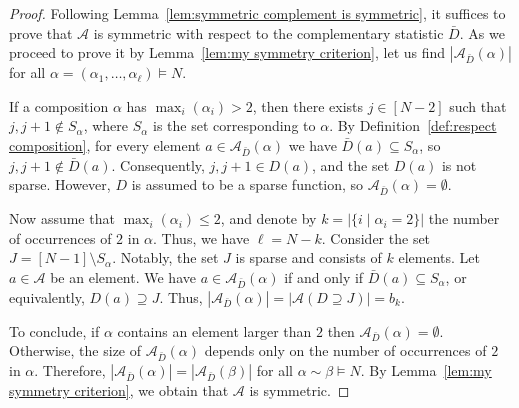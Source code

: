 \documentclass[11pt]{article}
\theoremstyle{definition}
\numberwithin{equation}{section}
\newcommand{\A}{\mathcal{A}}
\begin{document}
\begin{proof}
    Following Lemma~\ref{lem:symmetric complement is symmetric}, it suffices to prove that $\A$ is symmetric with respect to the complementary statistic $\bar{D}$. As we proceed to prove it by Lemma~\ref{lem:my symmetry criterion}, let us find $|\A_{\bar{D}}(\alpha)|$ for all $\alpha = (\alpha_1, \dots, \alpha_\ell) \vDash N$.
    
    If a composition $\alpha$ has $\max_i (\alpha_i) > 2$, 
    then there exists $j \in [N-2]$ such that $j,j+1 \notin S_\alpha$, where $S_\alpha$ is the set corresponding to $\alpha$. By Definition~\ref{def:respect composition}, for every element $a \in \A_{\bar{D}}(\alpha)$ we have $\bar{D}(a) \subseteq S_\alpha$, so $j, j + 1 \notin \bar{D}(a)$. Consequently, $j,j+1 \in D(a)$, and the set $D(a)$ is not sparse. However,
    $D$ is assumed to be a sparse function, so $\A_{\bar{D}}(\alpha) = \emptyset$.
    
    Now assume that $\max_i (\alpha_i) \le 2$, and denote by $k = |\{i \mid \alpha_i = 2\}|$ the number of occurrences of $2$ in $\alpha$. Thus, we have $\ell = N - k$.
    Consider the set $J = [N-1] \setminus S_\alpha$. Notably, the set $J$ is sparse and consists of $k$ elements.
    Let $a \in \A$ be an element. We have $a \in \A_{\bar{D}}(\alpha)$ if and only if $\bar{D}(a) \subseteq S_\alpha$, or equivalently, $D(a) \supseteq J$. Thus, $|\A_{\bar{D}}(\alpha)| = |\A(D \supseteq J)| = b_k$.
    
    To conclude, if $\alpha$ contains an element larger than $2$ then $\A_{\bar{D}}(\alpha) = \emptyset$. Otherwise, the size of $\A_{\bar{D}}(\alpha)$ depends only on the number of occurrences of $2$ in $\alpha$. Therefore, $|\A_{\bar{D}}(\alpha)| = |\A_{\bar{D}}(\beta)|$ for all $\alpha \sim \beta \vDash N$. By Lemma~\ref{lem:my symmetry criterion}, we obtain that $\A$ is symmetric.
\end{proof}
\end{document}
